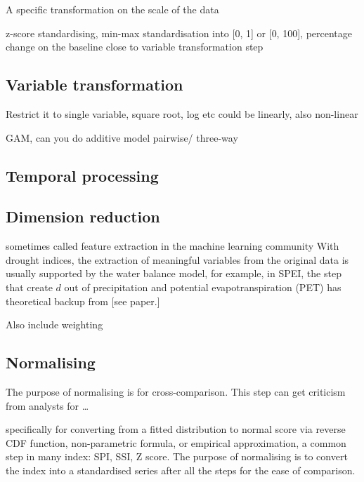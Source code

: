 \documentclass[
]{article}
\begin{document}
A specific transformation on the scale of the data

z-score standardising, min-max standardisation into {[}0, 1{]} or {[}0,
100{]}, percentage change on the baseline close to variable
transformation step

\hypertarget{variable-transformation}{%
\subsection{Variable transformation}\label{variable-transformation}}

Restrict it to single variable, square root, log etc could be linearly,
also non-linear

GAM, can you do additive model pairwise/ three-way

\hypertarget{temporal-processing}{%
\subsection{Temporal processing}\label{temporal-processing}}

\hypertarget{dimension-reduction}{%
\subsection{Dimension reduction}\label{dimension-reduction}}

sometimes called feature extraction in the machine learning community
With drought indices, the extraction of meaningful variables from the
original data is usually supported by the water balance model, for
example, in SPEI, the step that create \(d\) out of precipitation and
potential evapotranspiration (PET) has theoretical backup from {[}see
paper.{]}

Also include weighting

\hypertarget{normalising}{%
\subsection{Normalising}\label{normalising}}

The purpose of normalising is for cross-comparison. This step can get
criticism from analysts for \ldots{}

specifically for converting from a fitted distribution to normal score
via reverse CDF function, non-parametric formula, or empirical
approximation, a common step in many index: SPI, SSI, Z score. The
purpose of normalising is to convert the index into a standardised
series after all the steps for the ease of comparison.
\end{document}
